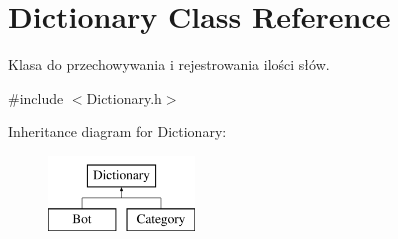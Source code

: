 \hypertarget{class_dictionary}{}\section{Dictionary Class Reference}
\label{class_dictionary}


Klasa do przechowywania i rejestrowania ilości słów.  




{\ttfamily \#include $<$Dictionary.\+h$>$}

Inheritance diagram for Dictionary\+:\begin{figure}[H]
\begin{center}
\leavevmode
\includegraphics[height=2.000000cm]{class_dictionary}
\end{center}
\end{figure}
